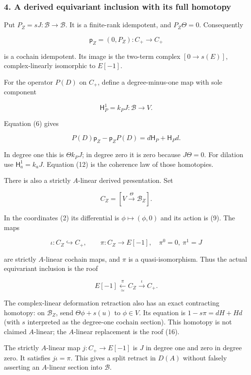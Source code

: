 \subsubsection{4. A derived equivariant inclusion with its full
homotopy}\label{pr_9:a-derived-equivariant-inclusion-with-its-full-homotopy}

Put \(P_Z=sJ:\mathscr B\to\mathscr B\). It is a finite-rank idempotent, and \(P_Z\Theta=0\).
Consequently

\[\mathsf p_Z=(0,P_Z):C_+\to C_+\tag{13}\]

is a cochain idempotent. Its image is the two-term complex \([0\to s(E)]\), complex-linearly
isomorphic to \(E[-1]\).

For the operator \(P(D)\) on \(C_+\), define a degree-minus-one map with sole component

\[\mathsf H_P^1=k_PJ:\mathscr B\to V.\]

Equation (6) gives

\[\boxed{P(D)\mathsf p_Z-\mathsf p_ZP(D)
=d\mathsf H_P+\mathsf H_Pd.}\tag{14}\]

In degree one this is \(\Theta k_PJ\); in degree zero it is zero because \(J\Theta=0\). For dilation
use \(\mathsf H_a^1=k_aJ\). Equation (12) is the coherence law of those homotopies.

There is also a strictly \(A\)-linear derived presentation. Set

\[C_Z=[V\xrightarrow{\Theta}\mathscr B_Z].\]

In the coordinates (2) its differential is \(\phi\mapsto(\phi,0)\) and its action is (9). The maps

\[\iota:C_Z\hookrightarrow C_+,\qquad
\pi:C_Z\to E[-1],\quad\pi^0=0,\ \pi^1=J\tag{15}\]

are strictly \(A\)-linear cochain maps, and \(\pi\) is a quasi-isomorphism. Thus the actual
equivariant inclusion is the roof

\[\boxed{E[-1]\xleftarrow[\simeq]{\pi}C_Z\xrightarrow{\iota}C_+.}\tag{16}\]

The complex-linear deformation retraction also has an exact contracting homotopy: on
\(\mathscr B_Z\), send \(\Theta\phi+s(u)\) to \(\phi\in V\). Its equation is \(1-s\pi=dH+Hd\) (with
\(s\) interpreted as the degree-one cochain section). This homotopy is not claimed \(A\)-linear; the
\(A\)-linear replacement is the roof (16).

The strictly \(A\)-linear map \(j:C_+\to E[-1]\) is \(J\) in degree one and zero in degree zero. It
satisfies \(j\iota=\pi\). This gives a split retract in \(D(A)\) without falsely asserting an
\(A\)-linear section into \(\mathscr B\).

